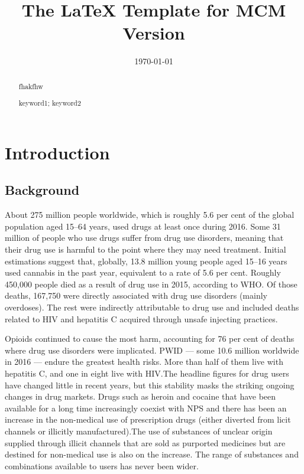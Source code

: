 \documentclass{mcmthesis}
\title{The \LaTeX{} Template for MCM Version \MCMversion}
\author{}
\date{\today}
\begin{document}
\begin{abstract}
	fhakfhw
	\begin{keywords}
		keyword1; keyword2
	\end{keywords}
\end{abstract}
\maketitle
\pagestyle{empty}
\tableofcontents

\newpage
\pagestyle{fancy}
\setcounter{page}{1}
\section{Introduction}

\subsection{Background}
About 275 million people worldwide, which is roughly 5.6 per cent of the global population aged 15–64 years, used drugs at least once during 2016. Some 31 million of people who use drugs suffer from drug use disorders, meaning that their drug use is harmful to the point where they may need treatment. Initial estimations suggest that, globally, 13.8 million young people aged 15–16 years used cannabis in the past year, equivalent to a rate of 5.6 per cent. 
Roughly 450,000 people died as a result of drug use in 2015, according to WHO. Of those deaths, 167,750 were directly associated with drug use disorders (mainly overdoses). The rest were indirectly attributable to drug use and included deaths related to HIV and hepatitis C acquired through unsafe injecting practices.

Opioids continued to cause the most harm, accounting for 76 per cent of deaths where drug use disorders were implicated. PWID — some 10.6 million worldwide in 2016 — endure the greatest health risks. More than half of them live with hepatitis C, and one in eight live with HIV.The headline figures for drug users have changed little in recent years, but this stability masks the striking ongoing changes in drug markets. Drugs such as heroin and cocaine that have been available for a long time increasingly coexist with NPS and there has been an increase in the non-medical use of prescription drugs (either diverted from licit channels or illicitly manufactured).The use of substances of unclear origin supplied through illicit channels that are sold as purported medicines but are destined for non-medical use is also on the increase. The range of substances and combinations available to users has never been wider. 
\end{document}
